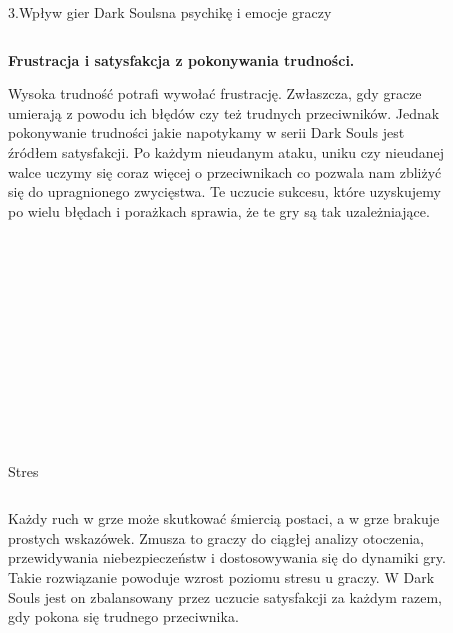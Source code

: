 \documentclass{beamer}
\begin{document}
\begin{frame}{3.Wpływ gier  \glqq Dark Souls\grqq na psychikę i emocje graczy} %
\begin{columns}
\begin{column}{0.5\textwidth}
\normalsize \textbf{ Frustracja i satysfakcja z pokonywania trudności.}

\small    Wysoka trudność potrafi wywołać frustrację. Zwłaszcza, gdy gracze umierają z powodu ich błędów czy też trudnych przeciwników. Jednak pokonywanie trudności jakie napotykamy w serii Dark Souls jest źródłem satysfakcji. Po każdym nieudanym ataku, uniku czy nieudanej walce uczymy się coraz więcej o przeciwnikach co pozwala nam zbliżyć się do upragnionego  zwycięstwa. Te uczucie sukcesu, które uzyskujemy po wielu błędach i porażkach sprawia, że te gry są tak uzależniające.
\end{column}

\begin{column}{0.5\textwidth}
    \begin{figure}
    \centering
        \texttt{[image: Satysfakcja.jpg]}
 
    \end{figure}
\end{column}
\end{columns}

\end{frame}

\begin{frame}{Stres} %
\begin{columns}
\begin{column}{0.5\textwidth}
\small      Każdy ruch w grze może skutkować śmiercią postaci, a w grze brakuje prostych wskazówek. Zmusza to graczy do ciągłej analizy otoczenia, przewidywania niebezpieczeństw i dostosowywania się do dynamiki gry.  Takie rozwiązanie powoduje wzrost poziomu stresu u graczy. W Dark Souls jest on zbalansowany przez uczucie satysfakcji za każdym razem, gdy pokona się trudnego przeciwnika.
\end{column}

\begin{column}{0.5\textwidth}
    \begin{figure}
    \centering
        \texttt{[image: stres.jpg]}
 
    \end{figure}
\end{column}
\end{columns}

\end{frame}
\end{document}
